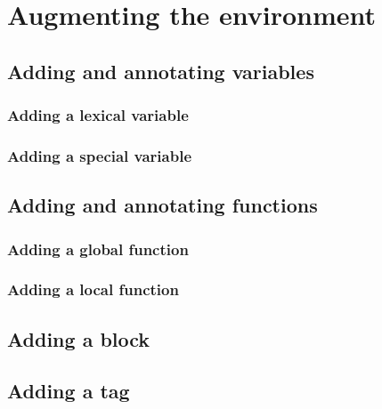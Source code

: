 \chapter{Augmenting the environment}

\section{Adding and annotating variables}

\subsection{Adding a lexical variable}

\subsection{Adding a special variable}

\section{Adding and annotating functions}

\subsection{Adding a global function}

\subsection{Adding a local function}

\section{Adding a block}

\section{Adding a tag}

